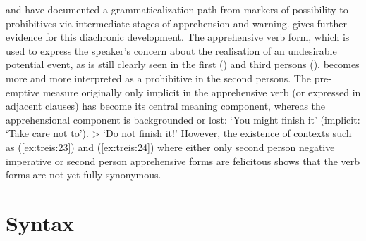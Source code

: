 \documentclass[output=paper,colorlinks,citecolor=brown,]{langscibook}
\begin{document}
\citet{Dobrushina2006} and \citet{pakendorfschalley2007} have documented a grammaticalization path from markers of possibility to prohibitives via intermediate stages of apprehension and warning.  gives further evidence for this diachronic development. The apprehensive verb form, which is used to express the speaker's concern about the realisation of an undesirable potential event, as is still clearly seen in the first () and third persons (), becomes more and more interpreted as a prohibitive in the second persons. The pre-emptive measure originally only implicit in the apprehensive verb (or expressed in adjacent clauses) has become its central meaning component, whereas the apprehensional component is backgrounded or lost: `You might finish it' (implicit: `Take care not to'). > `Do not finish it!' However, the existence of contexts such as (\ref{ex:treis:23}) and (\ref{ex:treis:24}) where either only second person negative imperative or second person apprehensive forms are felicitous shows that the verb forms are not yet fully synonymous.

\section{Syntax}\label{sec:treis:4}
\end{document}
